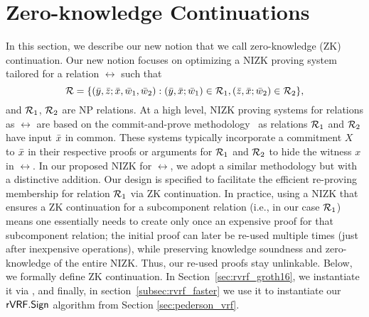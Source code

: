 


\section{Zero-knowledge Continuations}
\label{sec:rvrf_cont}
In this section, we describe our new notion that we call zero-knowledge (ZK) continuation. Our new notion focuses on optimizing a NIZK proving system tailored for a relation $ \rel $ such that
$$\mathcal{R} = \{(\bar{y}, \bar{z}; \bar{x}, \bar{w}_1, \bar{w}_2):  (\bar{y}, \bar{x}; \bar{w}_1) \in \mathcal{R}_1, (\bar{z}, \bar{x}; \bar{w}_2) \in \mathcal{R}_2 \},$$
and $\mathcal{R}_1$, $\mathcal{R}_2$ are NP relations. 
At a high level, NIZK proving systems for relations as $ \rel$ are based on the commit-and-prove methodology~\cite{Kilian1990UsesOR,CLOS02,LegoSNARK} 
as relations $\mathcal{R}_1$ and $\mathcal{R}_2$ have input $\bar{x}$ in common. These systems typically incorporate a commitment $X$ to $\bar{x}$ in their respective 
proofs or arguments for $ \mathcal{R}_1 $ and $ \mathcal{R}_2 $ to hide the witness $ x $ in $ \rel $. In our proposed NIZK  for $ \rel $, we adopt a similar methodology but with a distinctive addition. Our design is specified to facilitate the efficient re-proving membership for relation $\mathcal{R}_1$ via ZK continuation. 
In practice, using a NIZK that ensures a ZK continuation for a 
subcomponent relation (i.e., in our case $\mathcal{R}_1$) means one essentially needs to create only once an  expensive proof for that subcomponent 
relation; the initial proof can later be re-used multiple times (just after inexpensive operations), 
while preserving knowledge soundness and zero-knowledge of the entire NIZK. Thus, our re-used proofs stay unlinkable. 
Below, we formally define ZK continuation. In Section~\ref{sec:rvrf_groth16}, we instantiate it via  \SpecialG, and finally, in section~\ref{subsec:rvrf_faster} we use it to instantiate our $ {\mathsf{rVRF}}.{\mathsf{Sign}} $ algorithm from Section \ref{sec:pederson_vrf}. \\



